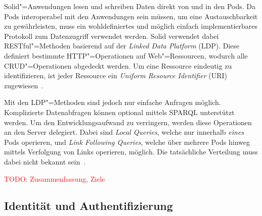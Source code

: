 Solid"=Anwendungen lesen und schreiben Daten direkt von und in den Pods.
Da Pods interoperabel mit den Anwendungen sein müssen, um eine Austauschbarkeit zu gewährleisten, muss ein wohldefiniertes und möglich einfach implementierbares Protokoll zum Datenzugriff verwendet werden.
Solid verwendet dabei RESTful"=Methoden basierend auf der \emph{Linked Data Platform} (LDP).
Diese definiert bestimmte HTTP"=Operationen auf Web"=Ressourcen, wodurch alle CRUD"=Operationen abgedeckt werden.
Um eine Ressource eindeutig zu identifizieren, ist jeder Ressource ein \emph{Uniform Resource Identifier} (URI) zugewiesen~\cite{mecklerWebLinkedData2023,sambraSolidPlatformDecentralized2016}.

Mit den LDP"=Methoden sind jedoch nur einfache Anfragen möglich.
Komplizierte Datenabfragen können optional mittels SPARQL unterstützt werden.
Um den Entwicklungsaufwand zu verringern, werden diese Operationen an den Server delegiert.
Dabei sind \emph{Local Queries}, welche nur innerhalb \emph{eines} Pods operieren, und \emph{Link Following Queries}, welche über mehrere Pods hinweg mittels Verfolgung von Links operieren, möglich.
Die tatsächliche Verteilung muss dabei nicht bekannt sein~\cite{sambraSolidPlatformDecentralized2016}.

\textcolor{red}{TODO: Zusammenfassung, Ziele}


\subsection{Identität und Authentifizierung}
